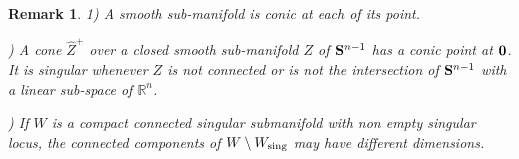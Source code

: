 \documentclass[11pt]{amsart}
\newtheorem{remark}[theorem]{Remark}
\newcommand{\field}[1]{\mathbb{#1}}
\newcommand{\R}{\field{R}}
\newcommand{\wh}[1]{\widehat{#1}}
\newcommand{\bbo}{{\bf 0}}
\newcommand{\bS}{{\bf S}}
\newcommand{\Rn}{{\R^n}}
\newcommand{\sing}{{\rm sing}}
\numberwithin{equation}{section}
\numberwithin{equation}{section}
\begin{document}
	
	\begin{remark}\label{rmk:strongly-conic}
		1) A smooth sub-manifold is conic at each of its point.
		
		\smallskip{}) A cone $\wh{Z}^+$ over a closed smooth sub-manifold $Z$ of $\bS^{n-1}$
		has a conic point at $\bbo$. It is singular whenever $Z$ is not connected 
		or is not the intersection of $\bS^{n-1}$ with a linear sub-space of $\Rn$.
 
\smallskip{}) If $W$ is a compact connected singular submanifold with non empty singular locus, the connected components of $W\setminus W_\sing$ may have different dimensions.   
	\end{remark}
	
\end{document}

